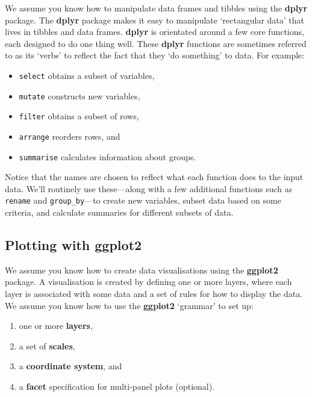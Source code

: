 \documentclass[
]{book}
\providecommand{\tightlist}{%
  \setlength{\itemsep}{0pt}\setlength{\parskip}{0pt}}
\begin{document}
We assume you know how to manipulate data frames and tibbles using the \textbf{dplyr} package. The \textbf{dplyr} package makes it easy to manipulate `rectangular data' that lives in tibbles and data frames. \textbf{dplyr} is orientated around a few core functions, each designed to do one thing well. These \textbf{dplyr} functions are sometimes referred to as its `verbs' to reflect the fact that they `do something' to data. For example:

\begin{itemize}
\tightlist
\item
  \texttt{select} obtains a subset of variables,
\item
  \texttt{mutate} constructs new variables,
\item
  \texttt{filter} obtains a subset of rows,
\item
  \texttt{arrange} reorders rows, and
\item
  \texttt{summarise} calculates information about groups.
\end{itemize}

Notice that the names are chosen to reflect what each function does to the input data. We'll routinely use these---along with a few additional functions such as \texttt{rename} and \texttt{group\_by}---to create new variables, subset data based on some criteria, and calculate summaries for different subsets of data.

\hypertarget{plotting-with-ggplot2}{%
\subsection*{\texorpdfstring{Plotting with \textbf{ggplot2}}{Plotting with ggplot2}}\label{plotting-with-ggplot2}}

We assume you know how to create data visualisations using the \textbf{ggplot2} package. A visualisation is created by defining one or more layers, where each layer is associated with some data and a set of rules for how to display the data. We assume you know how to use the \textbf{ggplot2} `grammar' to set up:

\begin{enumerate}
\def\labelenumi{\arabic{enumi})}
\tightlist
\item
  one or more \textbf{layers},
\item
  a set of \textbf{scales},
\item
  a \textbf{coordinate system}, and
\item
  a \textbf{facet} specification for multi-panel plots (optional).
\end{enumerate}
\end{document}
